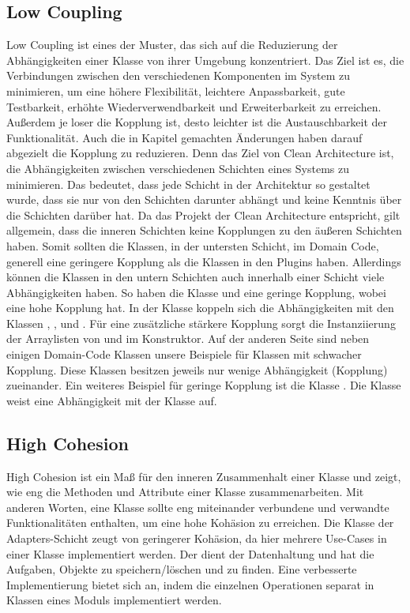 \subsection{Low Coupling}
Low Coupling ist eines der Muster, das sich auf die Reduzierung der Abhängigkeiten einer Klasse von ihrer Umgebung konzentriert. Das Ziel ist es, die Verbindungen zwischen den verschiedenen Komponenten im System zu minimieren, um eine höhere Flexibilität, leichtere Anpassbarkeit, gute Testbarkeit, erhöhte Wiederverwendbarkeit und Erweiterbarkeit zu erreichen. Außerdem je loser die Kopplung ist, desto leichter ist die Austauschbarkeit der Funktionalität.
Auch die in Kapitel  gemachten Änderungen haben darauf abgezielt die Kopplung zu reduzieren. Denn das Ziel von Clean Architecture ist, die Abhängigkeiten zwischen verschiedenen Schichten eines Systems zu minimieren. Das bedeutet, dass jede Schicht in der Architektur so gestaltet wurde, dass sie nur von den Schichten darunter abhängt und keine Kenntnis über die Schichten darüber hat. Da das Projekt der Clean Architecture entspricht, gilt allgemein, dass die inneren Schichten keine Kopplungen zu den äußeren Schichten haben. 
Somit sollten die Klassen, in der untersten Schicht, im Domain Code, generell eine geringere Kopplung als die Klassen in den Plugins haben. Allerdings können die Klassen in den untern Schichten auch innerhalb einer Schicht viele Abhängigkeiten haben. So haben die Klasse  und  eine geringe Kopplung, wobei  eine hohe Kopplung hat.  
In der Klasse  koppeln sich die Abhängigkeiten mit den Klassen , ,  und . Für eine zusätzliche stärkere Kopplung sorgt die Instanziierung der Arraylisten von  und  im Konstruktor.
Auf der anderen Seite sind neben einigen Domain-Code Klassen unsere \href{https://github.com/MichaelaHaag/RezeptApp/blob/main/0-Plugins/src/main/java/de/rezeptapp/plugins/gui}{} Beispiele für Klassen mit schwacher Kopplung. Diese Klassen besitzen jeweils nur wenige Abhängigkeit (Kopplung) zueinander. 
Ein weiteres Beispiel für geringe Kopplung ist die Klasse . Die Klasse weist eine Abhängigkeit mit der Klasse  auf.

\subsection{High Cohesion}
High Cohesion ist ein Maß für den inneren Zusammenhalt einer Klasse und zeigt, wie eng die Methoden und Attribute einer Klasse zusammenarbeiten. Mit anderen Worten, eine Klasse sollte eng miteinander verbundene und verwandte Funktionalitäten enthalten, um eine hohe Kohäsion zu erreichen. 
Die Klasse  der Adapters-Schicht zeugt von geringerer Kohäsion, da hier mehrere Use-Cases in einer Klasse implementiert werden. Der  dient der Datenhaltung und hat die Aufgaben, Objekte zu speichern/löschen und zu finden. Eine verbesserte Implementierung bietet sich an, indem die einzelnen Operationen separat in Klassen eines Moduls implementiert werden.

